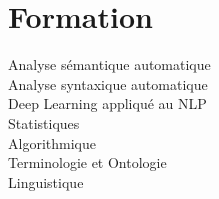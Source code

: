 \section{Formation}
\sectionsep
Analyse sémantique automatique \\
Analyse syntaxique automatique \\
Deep Learning appliqué au NLP \\
Statistiques \\
Algorithmique \\
Terminologie et Ontologie \\
Linguistique \\

\sectionsep